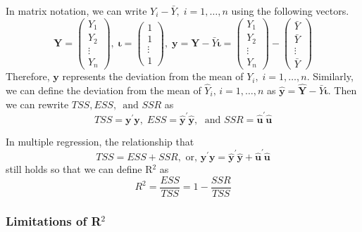 \documentclass[a4paper,11pt]{article}
\begin{document}
In matrix notation, we can write \(Y_i - \bar{Y},\; i=1,\ldots,n\) using
the following vectors.
\begin{equation*}
\mathbf{Y} =
\begin{pmatrix}
Y_1 \\
Y_2 \\
\vdots \\
Y_n
\end{pmatrix},\;
\boldsymbol{\iota} =
\begin{pmatrix}
1 \\
1 \\
\vdots \\
1
\end{pmatrix},\;
\mathbf{y} = \mathbf{Y} - \bar{Y} \boldsymbol{\iota} =
\begin{pmatrix}
Y_1 \\
Y_2 \\
\vdots \\
Y_n
\end{pmatrix}
-
\begin{pmatrix}
\bar{Y} \\
\bar{Y} \\
\vdots \\
\bar{Y}
\end{pmatrix}
\end{equation*}
Therefore, \(\mathbf{y}\) represents the deviation from the mean of
\(Y_i,\; i=1,\ldots,n\). Similarly, we can define the deviation from the
mean of \(\hat{Y}_i,\, i=1, \ldots, n\) as \(\hat{\mathbf{y}} =
\hat{\mathbf{Y}} - \bar{Y} \boldsymbol{\iota}\). Then we can rewrite
\(TSS, ESS,\, \text{ and } SSR\) as
\[ TSS = \mathbf{y}^{\prime} \mathbf{y},\; ESS =
\hat{\mathbf{y}}^{\prime} \hat{\mathbf{y}},\; \text{ and } SSR =
\hat{\mathbf{u}}^{\prime} \hat{\mathbf{u}} \]

In multiple regression, the relationship that
\[ TSS = ESS + SSR, \text{ or, } \mathbf{y}^{\prime} \mathbf{y} =
\hat{\mathbf{y}}^{\prime} \hat{\mathbf{y}} + \hat{\mathbf{u}}^{\prime}
\hat{\mathbf{u}}\]
still holds so that we can define R\(^{\text{2}}\) as
\begin{equation}
\label{eq:r2-center}
R^2 = \frac{ESS}{TSS} = 1 - \frac{SSR}{TSS}
\end{equation}

\subsubsection*{Limitations of R\(^{\text{2}}\)}
\label{sec:org0630986}
\end{document}
